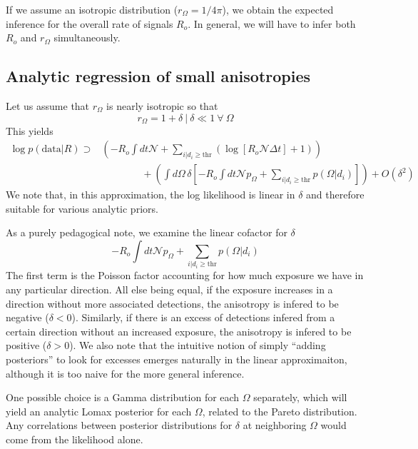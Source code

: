 \documentclass{article}
\begin{document}
If we assume an isotropic distribution ($r_\Omega = 1/4\pi$), we obtain the expected inference for the overall rate of signals $R_o$.
In general, we will have to infer both $R_o$ and $r_\Omega$ simultaneously.



\subsection*{Analytic regression of small anisotropies}

Let us assume that $r_\Omega$ is nearly isotropic so that 
\begin{equation}
    \left. r_\Omega = 1+\delta \ \right| \ \delta \ll 1 \ \forall \ \Omega
\end{equation}
This yields
\begin{align}
    \log p(\mathrm{data}|R) \supset & \left( - R_o \int dt \mathcal{N} + \sum\limits_{i|d_i\geq\mathrm{thr}} \left( \log\left[ R_o \mathcal{N} \Delta t \right] + 1 \right) \right) \nonumber \\
                                    & \quad \quad \quad \quad + \left( \int d\Omega\, \delta \left[ - R_o \int dt \mathcal{N} p_\Omega + \sum\limits_{i|d_i\geq\mathrm{thr}} p(\Omega|d_i) \right] \right) + O\left(\delta^2\right)
\end{align}
We note that, in this approximation, the log likelihood is linear in $\delta$ and therefore suitable for various analytic priors. 

As a purely pedagogical note, we examine the linear cofactor for $\delta$
\begin{equation}\label{eq:linear cofactor}
    -R_o \int dt \mathcal{N} p_\Omega + \sum\limits_{i|d_i\geq\mathrm{thr}} p(\Omega|d_i)
\end{equation}
The first term is the Poisson factor accounting for how much exposure we have in any particular direction. 
All else being equal, if the exposure increases in a direction without more associated detections, the anisotropy is infered to be negative ($\delta < 0$). 
Similarly, if there is an excess of detections infered from a certain direction without an increased exposure, the anisotropy is infered to be positive ($\delta > 0$).
We also note that the intuitive notion of simply ``adding posteriors'' to look for excesses emerges naturally in the linear approximaiton, although it is too naive for the more general inference.

One possible choice is a Gamma distribution for each $\Omega$ separately, which will yield an analytic Lomax posterior for each $\Omega$, related to the Pareto distribution.
Any correlations between posterior distributions for $\delta$ at neighboring $\Omega$ would come from the likelihood alone.
\end{document}
